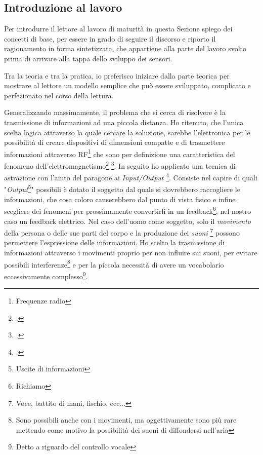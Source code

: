 \documentclass[a4paper, 10pt, final]{article} %
\begin{document}
    \subsection{Introduzione al lavoro}\label{sec:IntroReader}
    Per introdurre il lettore al lavoro di maturit\`{a} in questa Sezione spiego dei concetti di base, per essere in grado di seguire il discorso e riporto il ragionamento in forma sintetizzata, che appartiene alla parte del lavoro svolto prima di arrivare alla tappa dello sviluppo dei sensori.

    Tra la teoria e tra la pratica, io preferisco iniziare dalla parte teorica per mostrare al lettore un modello semplice che pu\`{o} essere sviluppato, complicato e perfezionato nel corso della lettura.
    
    Generalizzando massimamente, il problema che si cerca di risolvere \`{e} la trasmissione di informazioni ad una piccola distanza.
    Ho ritenuto, che l'unica scelta logica attraverso la quale cercare la soluzione, sarebbe l'elettronica per le possibilit\`{a} di creare dispositivi di dimensioni compatte e di trasmettere informazioni attraverso RF\footnote{Frequenze radio} che sono per definizione una caratteristica del fenomeno dell'elettromagnetismo\footcite["Il campo" (elettromagnetico) "pu\`{o} essere visto come la combinazione di un campo elettrico e un campo magnetico"]{Electromagnetism:Wiki} \footcite["L'elettricità è correlata al magnetismo, essendo entrambi parte del fenomeno dell'elettromagnetismo"]{Electricity:Wiki}.
    In seguito ho applicato una tecnica di astrazione con l'aiuto del paragone ai \emph{Input/Output} \footcite[]{IO:Wiki}.
    Consiste nel capire di quali "\emph{Output}\footnote{Uscite di informazioni}" possibili \`{e} dotato il soggetto dal quale si dovrebbero raccogliere le informazioni, che cosa coloro causerebbero dal punto di vista fisico e infine scegliere dei fenomeni per prossimamente convertirli in un feedback\footnote{Richiamo}, nel nostro caso un feedback elettrico.
    Nel caso dell'uomo come soggetto, solo il \emph{movimento} della persona o delle sue parti del corpo e la produzione dei \emph{suoni} \footnote{Voce, battito di mani, fischio, ecc...} possono permettere l'espressione delle informazioni.
    Ho scelto la trasmissione di informazioni attraverso i movimenti proprio per non influire sui suoni, per evitare possibili interferenze\footnote{Sono possibili anche con i movimenti, ma oggettivamente sono pi\`{u} rare mettendo come motivo la possibilit\`{a} dei suoni di diffondersi nell'aria} e per la piccola necessit\`{a} di avere un vocabolario eccessivamente complesso\footnote{Detto a riguardo del controllo vocale}.
\end{document}
